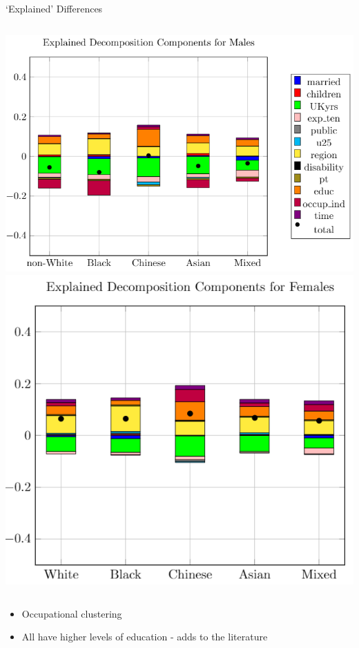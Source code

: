\documentclass[aspectratio=169,12pt]{beamer}
\begin{document}
\begin{frame}{\enquote*{Explained} Differences}
\vspace{-10pt}
    \begin{columns}
        \vspace{5pt}
		\includegraphics[width=\textwidth]{beamer/male_explained_pic}
	    \vspace{5pt}
		\includegraphics[width=\textwidth]{beamer/female_explained_pic.png}
	\end{columns}
	\vspace{-2pt}
	\begin{itemize}
	    \item Occupational clustering
	    \item All have higher levels of education - adds to the literature
	\end{itemize}
\end{frame}
\end{document}
